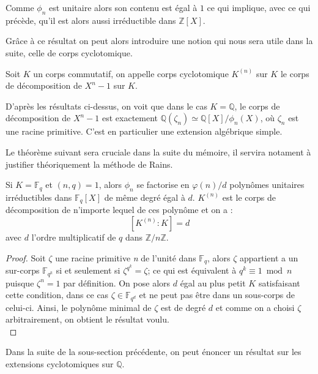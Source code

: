 \documentclass[a4paper]{article} %
\numberwithin{section}{part}
\numberwithin{equation}{section}
\newcommand\nroot[1]{\textit{#1}\up{\textit{ième}}}
\newcommand\zmodn[1]{\mathbb{Z}/#1\mathbb{Z}}
\newcommand\GF[1]{\mathbb{F}_{#1}}
\newcommand\QQ{\mathbb{Q}}
\newcommand\ZZ{\mathbb{Z}}
\begin{document}
\begin{rem}
Comme $\phi_n$ est unitaire alors son contenu est égal à $1$ ce qui implique, 
avec ce qui précède, qu'il est alors aussi irréductible dans $\ZZ[X]$.
\end{rem}
\vspace{0.3cm}
Grâce à ce résultat on peut alors introduire une notion qui nous sera utile dans
la suite, celle de corps cyclotomique.

\begin{defn}
Soit $K$ un corps commutatif, on appelle corps cyclotomique $K^{(n)}$ sur $K$ le
corps de décomposition de $X^n - 1$ sur $K$.
\end{defn}

\begin{rem}
D'après les résultats ci-dessus, on voit que dans le cas $K = \QQ$, le 
corps de décomposition de $X^n - 1$ est exactement $\QQ(\zeta_n) \simeq 
\QQ[X]/\phi_n(X)$, où $\zeta_n$ est une racine primitive. C'est en 
particulier une extension algébrique simple.
\end{rem}

Le théorème suivant sera cruciale dans la suite du mémoire, il servira notament 
à justifier théoriquement la méthode de Rains.

\begin{thm}
\label{th:polycycldecomp}
Si $K = \GF{q}$ et $(n,q) = 1$, alors $\phi_n$ se factorise en $\varphi(n)/d$ 
polynômes unitaires irréductibles dans $\GF{q}[X]$ de même degré égal à $d$. 
$K^{(n)}$ est le corps de décomposition de n'importe lequel de ces polynôme et 
on a :
\[[K^{(n)}:K] = d\]
avec $d$ l'ordre multiplicatif de $q$ dans $\zmodn{n}$.
\end{thm}
\begin{proof}
Soit $\zeta$ une racine primitive \nroot{n} de l'unité dans $\GF{q}$, alors 
$\zeta$ appartient a un sur-corps $\GF{q^k}$ si et seulement si $\zeta^{q^k} = 
\zeta$; ce qui est équivalent à $q^k \equiv 1 \bmod n$ puisque $\zeta^n = 1$ par
définition. On pose alors $d$ égal au plus petit $K$ satisfaisant cette 
condition, dans ce cas $\zeta\in\GF{q^d}$ et ne peut pas être dans un sous-corps
de celui-ci. Ainsi, le polynôme minimal de $\zeta$ est de degré $d$ et comme on 
a choisi $\zeta$ arbitrairement, on obtient le résultat voulu.\\
\end{proof}

Dans la suite de la sous-section précédente, on peut énoncer un résultat sur les
extensions cyclotomiques sur $\QQ$.
\end{document}
